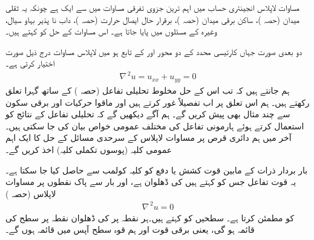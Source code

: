 مساوات لاپلاس  انجینئری حساب میں اہم ترین جزوی تفرقی مساوات میں سے ایک ہے چونکہ  یہ ثقلی میدان (حصہ )، ساکن برقی میدان  (حصہ )، برقرار حال ایصال حرارت (حصہ )، داب نا پذیر بہاو سیال، وغیرہ کے مسئلوں میں پایا جاتا ہے۔ اس مساوات کے حل کو  کہتے ہیں۔

دو بعدی صورت جہاں  کارتیسی محدد کے دو محور  اور  کے تابع ہو میں لاپلاس مساوات درج ذیل صورت اختیار کرتی ہے۔
\begin{align*}
\nabla^{\,2}u=u_{xx}+u_{yy}=0
\end{align*}
ہم جانتے ہیں کہ تب اس کے حل مخلوط تحلیلی تفاعل (حصہ ) کے ساتھ گہرا تعلق رکھتے ہیں۔ ہم اس تعلق پر اب تفصیلاً غور کرتے ہیں اور ماقوا حرکیات اور برقی سکون سے چند مثال بھی پیش کریں گے۔ ہم آگے دیکھیں گے کہ تحلیلی تفاعل کے نتائج کو استعمال کرتے ہوئے ہارمونی تفاعل کی مختلف عمومی خواص  بیان کی جا سکتی ہیں۔ آخر میں ہم دائری قرص پر مساوات لاپلاس کے سرحدی مسائل کے حل کا ایک اہم عمومی کلیہ (پوسوں تکملی کلیہ) اخذ کریں گے۔

بار بردار ذرات کے مابین قوت کشش یا دفع کو کلیہ کولمب سے حاصل  کیا جا سکتا ہے۔یہ قوت تفاعل  جس کو  کہتے ہیں کی ڈھلوان ہے، اور بار سے پاک نقطوں پر  مساوات لاپلاس (حصہ )
\begin{align*}
\nabla^{\,2}u=0
\end{align*}
کو مطمئن کرتا ہے۔ سطحیں  کو  کہتے ہیں۔ہر نقطہ  پر  کی ڈھلوان نقطہ  پر سطح  کی قائمہ ہو گی، یعنی برقی قوت اور ہم قوہ سطح آپس میں قائمہ ہوں گے۔

